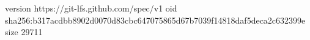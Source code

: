 version https://git-lfs.github.com/spec/v1
oid sha256:b317acdbb8902d0070d83cbc647075865d67b7039f14818daf5deca2c632399e
size 29711
